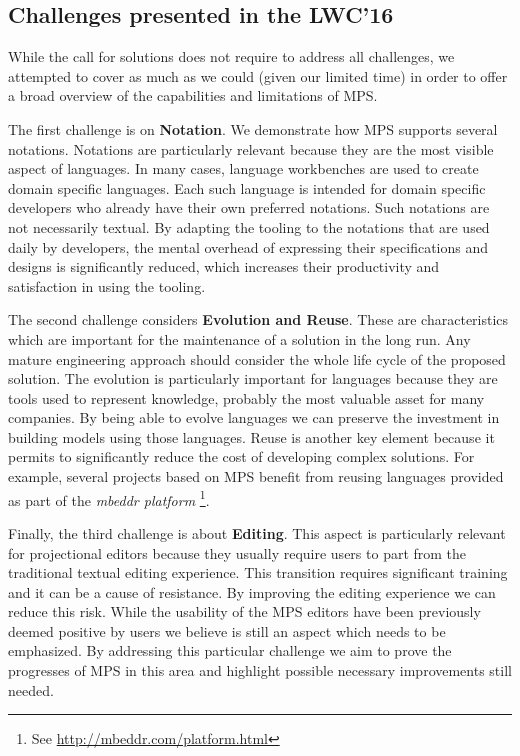 \documentclass[preprint,numbers,10pt]{sigplanconf}
\begin{document}
\subsection{Challenges presented in the LWC'16}

While the call for solutions does not require to address all challenges, we attempted to cover as much as we could (given our limited time) in order to offer a broad overview of the capabilities and limitations of MPS.

The first challenge is on \textbf{Notation}. We demonstrate how MPS supports several notations. Notations are particularly relevant because they are the most visible aspect of languages. In many cases, language workbenches are used to create domain
specific languages. Each such language is intended for domain specific developers who already have their own preferred notations. Such notations are not necessarily textual. By adapting the tooling to the notations that are used daily by developers, the mental overhead of expressing their specifications and designs is significantly reduced, which increases their productivity and satisfaction in using the tooling.

The second challenge considers \textbf{Evolution and Reuse}. These are
characteristics which are important for the maintenance of a solution in the long run. Any
mature engineering approach should consider the whole life cycle of the proposed
solution. The evolution is particularly important for languages because they are
tools used to represent knowledge, probably the most valuable asset for many
companies. By being able to evolve languages we can preserve the investment
in building models using those languages. Reuse is another key element because
it permits to significantly reduce the cost of developing complex solutions. For
example, several projects based on MPS benefit from reusing languages provided
as part of the \emph{mbeddr platform} \footnote{See
\url{http://mbeddr.com/platform.html}}.

Finally, the third challenge is about \textbf{Editing}. This aspect is
particularly relevant for projectional editors because they usually require
users to part from the traditional textual editing experience. This transition
requires significant training and it can be a cause of resistance. By improving
the editing experience we can reduce this risk. While the usability of the MPS
editors have been previously deemed positive by users \cite{Voelter2014} we
believe is still an aspect which needs to be emphasized. By addressing this
particular challenge we aim to prove the progresses of MPS in this area and
highlight possible necessary improvements still needed.
\end{document}

